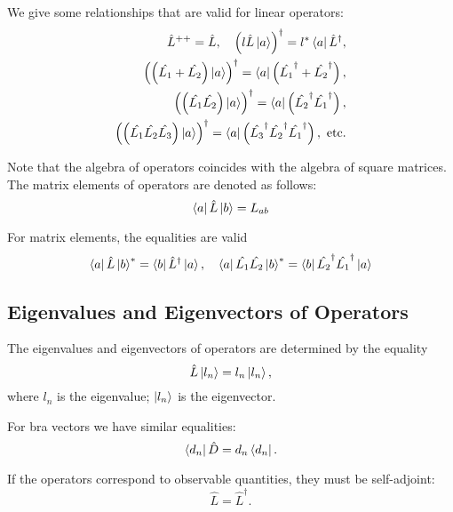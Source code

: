 We give some relationships that are valid for linear operators:
\begin{eqnarray}
\hat{L}^{++} = \hat{L}, \quad
\left(l \hat{L} \ket{ a } \right)^{\dag} = 
l^{*} \bra{ a } \hat{L}^{\dag}, 
\nonumber \\
\left(\left(\hat{L_1} + \hat{L_2} \right) \ket{ a } \right)^{\dag} = 
\bra{ a } \left(\hat{L_1}^{\dag} + \hat{L_2}^\dag \right), 
\nonumber \\
\left(\left(\hat{L_1} \hat{L_2} \right) \ket{ a } \right)^{\dag} = 
\bra{ a } \left(\hat{L_2}^{\dag} \hat{L_1}^\dag \right),
\nonumber \\
\left(\left(\hat{L_1} \hat{L_2} \hat{L_3}\right) \ket{ a } \right)^{\dag} = 
\bra{ a } \left(\hat{L_3}^{\dag} \hat{L_2}^\dag \hat{L_1}^\dag \right), 
\mbox{ etc.}
\label{eqAddDirac_propert}
\end{eqnarray}

Note that the algebra of operators coincides with the algebra of square matrices. The matrix elements of operators are denoted as follows: 
\begin{equation}
\bra{a}\hat{L}\ket{b} = L_{ab}
\end{equation}

For matrix elements, the equalities are valid
\begin{equation}
\bra{a}\hat{L}\ket{b}^{*} = 
\bra{b}\hat{L}^{\dag}\ket{a}, \quad
\bra{a}\hat{L_1}\hat{L_2}\ket{b}^{*} = 
\bra{b}\hat{L_2}^{\dag}\hat{L_1}^\dag\ket{a}
\end{equation}

\subsection{Eigenvalues and Eigenvectors of Operators} 
The eigenvalues and eigenvectors of operators are determined by the equality
\begin{equation}
\hat{L} \ket{l_n} = l_n \ket{l_n},
\end{equation}
where $l_n$ is the eigenvalue; $\ket{l_n}$ is the eigenvector.

For bra vectors we have similar equalities:
\begin{equation}
\bra{d_n} \hat{D}  = d_n \bra{d_n}.
\end{equation}

If the operators correspond to observable quantities, they must be self-adjoint:
\begin{equation}
\hat{L}  = \hat{L}^{\dag}.
\label{eqAddDirac_ermit}
\end{equation}

